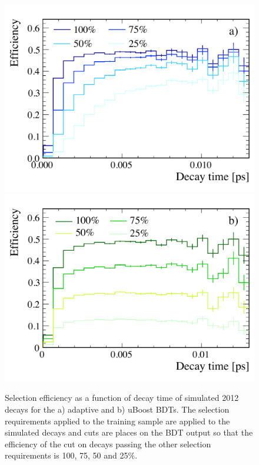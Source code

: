 
\begin{figure}[tbp]
    \centering
        \includegraphics[width=0.49 \textwidth]{./Figs/Selection/BDT_acceptances.pdf}
       \includegraphics[width=0.49 \textwidth]{./Figs/Selection/uBoost_accpt.pdf}
    \caption{Selection efficiency as a function of decay time of simulated 2012 \bsmumu decays for the a) adaptive and b) uBoost BDTs. The selection requirements applied to the training sample are applied to the simulated decays and cuts are places on the BDT output so that the efficiency of the cut on decays passing the other selection requirements is 100, 75, 50 and 25$\%$.}%
    \label{fig:accptsELBDTs}
\end{figure}


